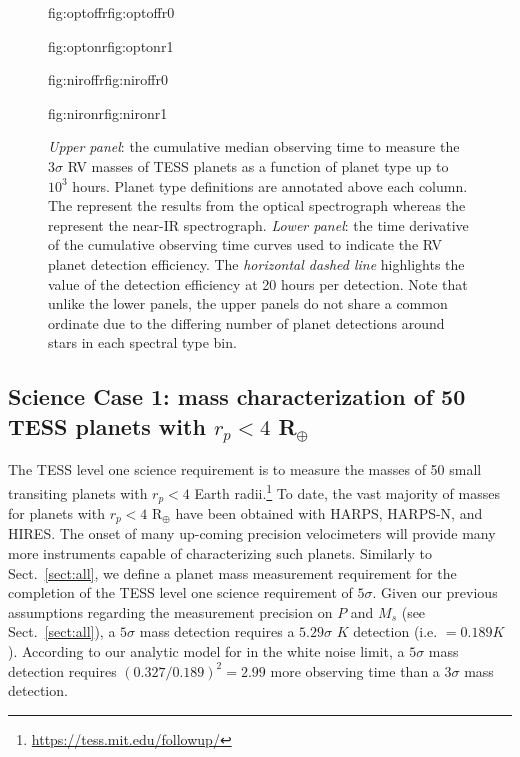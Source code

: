 \begin{figure*}
  \centering
  \hspace{-\hsize}%
  \begin{ocg}{fig:optoffr}{fig:optoffr}{0}%
  \end{ocg}%
  \begin{ocg}{fig:optonr}{fig:optonr}{1}%
  \end{ocg}
  \hspace{-\hsize}%
  \begin{ocg}{fig:niroffr}{fig:niroffr}{0}%
  \end{ocg}%
  \begin{ocg}{fig:nironr}{fig:nironr}{1}%
  \end{ocg}
  \hspace{-\hsize}%
  \caption{\emph{Upper panel}: the cumulative median observing time to measure the $3\sigma$ RV masses of
    TESS planets as a function of planet type up to $10^3$ hours. Planet type definitions are annotated above
    each column. The  
     represent the results from
    the optical spectrograph whereas the
     represent the near-IR
    spectrograph. \emph{Lower panel}: the time derivative of the cumulative observing time curves used to indicate
    the RV planet detection efficiency. The \emph{horizontal dashed line} highlights the value of the detection
    efficiency at 20 hours per detection.
    Note that unlike the lower panels, the upper panels do not share a common ordinate due to the differing
    number of planet detections around stars in each spectral type bin.}
  \label{fig:cumulativerp}
\end{figure*}


\subsection{Science Case 1: mass characterization of 50 TESS planets with $r_p < 4$ R$_{\oplus}$} \label{sect:lvl1}
The TESS level one science requirement is to measure the masses of 50 small transiting
planets with $r_p < 4$ Earth
radii.\footnote{\href{https://tess.mit.edu/followup/}{https://tess.mit.edu/followup/}}
To date, the vast majority of masses for planets with $r_p <4$ R$_{\oplus}$ have been obtained
with HARPS, HARPS-N, and HIRES. The onset of many up-coming precision velocimeters
will provide many more instruments capable of characterizing
such planets. Similarly to Sect.~\ref{sect:all}, we define a planet mass measurement
requirement for the completion of the TESS level one science requirement of $5\sigma$. 
Given our previous assumptions regarding the measurement precision on $P$ and
$M_s$ (see Sect.~\ref{sect:all}),
a $5\sigma$ mass detection requires a $5.29\sigma$ $K$ detection (i.e. \sigK{} $=0.189 K$).
According to our analytic model for \nrv{} in the white noise limit, a $5\sigma$ mass detection requires
$(0.327/0.189)^2 = 2.99$ more observing time than a $3\sigma$ mass detection.

